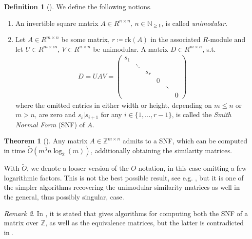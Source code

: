 \documentclass[10pt]{amsart}
\numberwithin{equation}{section}
\theoremstyle{definition}
\newtheorem{theorem}{Theorem}
\newtheorem{definition}{Definition}
\theoremstyle{remark}
\newtheorem{remark}[theorem]{Remark}
\begin{document}
    \begin{definition}[{\cite[p. 267]{Storjohann_1996}}]
        We define the following notions.
        \begin{enumerate}[label=(\roman*), wide]
            \item An invertible square matrix \(A \in R^{n \times n}\), \(n \in \mathbb{N}_{\geq 1}\), is called \emph{unimodular}.
            \item Let \(A \in R^{m \times n}\) be some matrix, \(r \coloneqq \text{rk}(A)\) in the associated \(R\)-module and let \(U \in R^{m \times m}\), \(V \in R^{n \times n}\) be unimodular. A matrix \(D \in R^{m \times n}\), s.t.
            \begin{align}
                D = UAV = \begin{pmatrix}
                    s_1\\
                        & \ddots\\
                        &        & s_r\\
                        &        &      & 0\\
                        &        &      &   & \ddots\\
                        &        &      &   &        & 0
                \end{pmatrix}
            \end{align}
            where the omitted entries in either width or height, depending on \(m \leq n\) or \(m > n\), are zero and \(s_i|s_{i+1}\) for any \(i \in \{1, ..., r-1\}\), is called the \emph{Smith Normal Form} (SNF) of \(A\).
        \end{enumerate}
    \end{definition}

    \begin{theorem}[{\cite[pp. 1073-1074]{Hafner_1991}}]
        Any matrix \(A \in \mathbb{Z}^{m \times n}\) admits to a SNF, which can be computed in time \(\tilde{O}(m^3n\log_2(m))\), additionally obtaining the similarity matrices.
    \end{theorem}

    With \(\tilde{O}\), we denote a looser version of the \(O\)-notation, in this case omitting a few logarithmic factors. This is not the best possible result, see e.g. \cite[pp. 273-274]{Storjohann_1996}, but it is one of the simpler algorithms recovering the unimodular similarity matrices as well in the general, thus possibly singular, case.

    \begin{remark}
        In \cite[p. 23]{Lomont}, it is stated that \cite{Storjohann_1996} gives algorithms for computing both the SNF of a matrix over \(\mathbb{Z}\), as well as the equivalence matrices, but the latter is contradicted in \cite[p. 268]{Storjohann_1996}.
    \end{remark}
\end{document}

